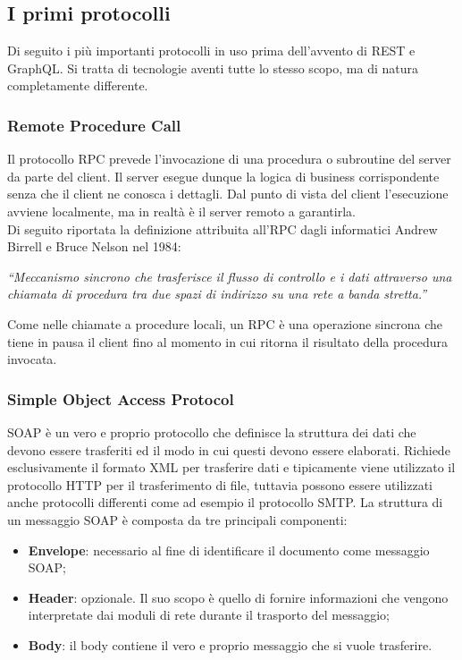 \subsection{I primi protocolli}
Di seguito i più importanti protocolli in uso prima dell'avvento di REST e GraphQL. Si tratta di tecnologie aventi tutte lo stesso scopo, ma di natura completamente differente.
\subsubsection*{Remote Procedure Call}
Il protocollo RPC prevede l'invocazione di una procedura o subroutine del server da parte del client. Il server esegue dunque la logica di business corrispondente senza che il client ne conosca i dettagli. Dal punto di vista del client l'esecuzione avviene localmente, ma in realtà è il server remoto a garantirla.\\
Di seguito riportata la definizione attribuita all'RPC dagli informatici Andrew Birrell e Bruce Nelson nel 1984:
  \begin{quoting}
    \textit{“Meccanismo sincrono che trasferisce il flusso di controllo e i dati attraverso una chiamata di procedura tra due spazi di indirizzo su una rete a banda stretta.”}
  \end{quoting}
Come nelle chiamate a procedure locali, un RPC è una operazione sincrona che tiene in pausa il client fino al momento in cui ritorna il risultato della procedura invocata.
\subsubsection*{Simple Object Access Protocol}
SOAP è un vero e proprio protocollo che definisce la struttura dei dati che devono essere trasferiti ed il modo in cui questi devono essere elaborati. Richiede esclusivamente il formato XML per trasferire dati e tipicamente viene utilizzato il protocollo HTTP per il trasferimento di file, tuttavia possono essere utilizzati anche protocolli differenti come ad esempio il protocollo SMTP. La struttura di un messaggio SOAP è composta da tre principali componenti:
\begin{itemize}
  \item \textbf{Envelope}: necessario al fine di identificare il documento come messaggio SOAP;
  \item \textbf{Header}: opzionale. Il suo scopo è quello di fornire informazioni che vengono interpretate dai moduli di rete durante il trasporto del messaggio;
  \item \textbf{Body}: il body contiene il vero e proprio messaggio che si vuole trasferire.
\end{itemize}

